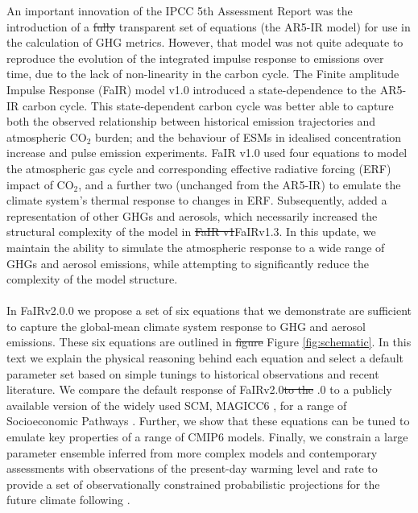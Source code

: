 \documentclass[gmd, manuscript]{copernicus}
\providecommand{\DIFadd}[1]{{\protect\color{blue}#1}} %
\providecommand{\DIFdel}[1]{{\protect\color{red}\sout{#1}}}                      %
\providecommand{\DIFaddbegin}{} %
\providecommand{\DIFaddend}{} %
\providecommand{\DIFdelbegin}{} %
\providecommand{\DIFdelend}{} %
\begin{document}
%
An important innovation of the IPCC 5th Assessment Report \citep{Myhre2013a} was the introduction of a \DIFdelbegin \DIFdel{fully }\DIFdelend transparent set of equations (the AR5-IR model) for use in the calculation of GHG metrics. However, that model was not quite adequate to reproduce the evolution of the integrated impulse response to emissions over time, due to the lack of non-linearity in the carbon cycle. The Finite amplitude Impulse Response (FaIR) model v1.0 \citep{Millar2016} introduced a state-dependence to the AR5-IR carbon cycle. This state-dependent carbon cycle was better able to capture both the observed relationship between historical emission trajectories and atmospheric CO$_2$ burden; and the behaviour of ESMs in idealised concentration increase and pulse emission experiments. FaIR v1.0 used four equations to model the atmospheric gas cycle and corresponding effective radiative forcing (ERF) impact of CO$_2$, and a further two (unchanged from the AR5-IR) to emulate the climate system's thermal response to changes in ERF. Subsequently, \cite{Smith2018} added a representation of other GHGs and aerosols, which necessarily increased the structural complexity of the model in \DIFdelbegin \DIFdel{FaIR v1}\DIFdelend \DIFaddbegin \DIFadd{FaIRv1}\DIFaddend .3. In this update, we maintain the ability to simulate the atmospheric response to a wide range of GHGs and aerosol emissions, while attempting to significantly reduce the complexity of the model structure. \\\\
%
In FaIRv2.0\DIFaddbegin \DIFadd{.0 }\DIFaddend we propose a set of six equations that we demonstrate are sufficient to capture the global-mean climate system response to GHG and aerosol emissions. These six equations are outlined in \DIFdelbegin \DIFdel{figure }\DIFdelend \DIFaddbegin \DIFadd{Figure }\DIFaddend \ref{fig:schematic}. In this text we explain the physical reasoning behind each equation and select a default parameter set based on simple tunings to historical observations and recent literature. We compare the default response of FaIRv2.0\DIFdelbegin \DIFdel{to the }\DIFdelend \DIFaddbegin \DIFadd{.0 to }\DIFaddend a publicly available version of the widely used SCM, MAGICC6 \citep{Meinshausen2011,Meinshausen2011b}, for a range of Socioeconomic Pathways \citep[SSPs]{Riahi2017}. Further, we show that these equations can be tuned to emulate key properties of a range of CMIP6 \citep{Eyring2016} models. Finally, we constrain a large parameter ensemble inferred from more complex models and contemporary assessments with observations of the present-day warming level and rate to provide a set of observationally constrained probabilistic projections for the future climate following \citep{Smith2018}.\\\\
\end{document}
